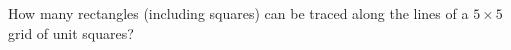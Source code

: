 How many rectangles (including squares) can be traced along the lines of a $5\times5$ grid of unit squares?
